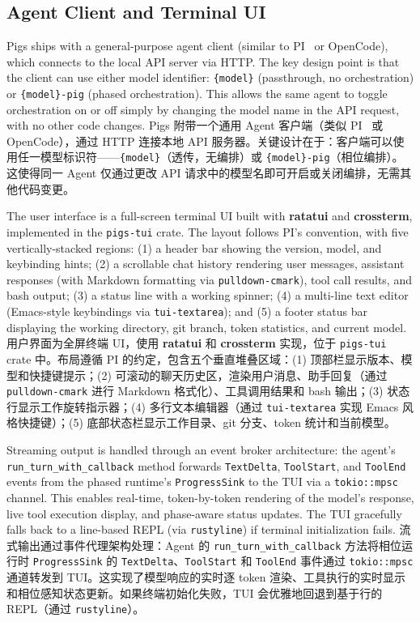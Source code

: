 \subsection{Agent Client and Terminal UI}

Pigs ships with a general-purpose agent client (similar to PI~\citep{omo2026} or OpenCode), which connects to the local API server via HTTP. The key design point is that the client can use either model identifier: \texttt{\{model\}} (passthrough, no orchestration) or \texttt{\{model\}-pig} (phased orchestration). This allows the same agent to toggle orchestration on or off simply by changing the model name in the API request, with no other code changes.
Pigs 附带一个通用 Agent 客户端（类似 PI~\citep{omo2026} 或 OpenCode），通过 HTTP 连接本地 API 服务器。关键设计在于：客户端可以使用任一模型标识符——\texttt{\{model\}}（透传，无编排）或 \texttt{\{model\}-pig}（相位编排）。这使得同一 Agent 仅通过更改 API 请求中的模型名即可开启或关闭编排，无需其他代码变更。

The user interface is a full-screen terminal UI built with \textbf{ratatui} and \textbf{crossterm}, implemented in the \texttt{pigs-tui} crate. The layout follows PI's convention, with five vertically-stacked regions: (1) a header bar showing the version, model, and keybinding hints; (2) a scrollable chat history rendering user messages, assistant responses (with Markdown formatting via \texttt{pulldown-cmark}), tool call results, and bash output; (3) a status line with a working spinner; (4) a multi-line text editor (Emacs-style keybindings via \texttt{tui-textarea}); and (5) a footer status bar displaying the working directory, git branch, token statistics, and current model.
用户界面为全屏终端 UI，使用 \textbf{ratatui} 和 \textbf{crossterm} 实现，位于 \texttt{pigs-tui} crate 中。布局遵循 PI 的约定，包含五个垂直堆叠区域：(1) 顶部栏显示版本、模型和快捷键提示；(2) 可滚动的聊天历史区，渲染用户消息、助手回复（通过 \texttt{pulldown-cmark} 进行 Markdown 格式化）、工具调用结果和 bash 输出；(3) 状态行显示工作旋转指示器；(4) 多行文本编辑器（通过 \texttt{tui-textarea} 实现 Emacs 风格快捷键）；(5) 底部状态栏显示工作目录、git 分支、token 统计和当前模型。

Streaming output is handled through an event broker architecture: the agent's \texttt{run\_turn\_with\_callback} method forwards \texttt{TextDelta}, \texttt{ToolStart}, and \texttt{ToolEnd} events from the phased runtime's \texttt{ProgressSink} to the TUI via a \texttt{tokio::mpsc} channel. This enables real-time, token-by-token rendering of the model's response, live tool execution display, and phase-aware status updates. The TUI gracefully falls back to a line-based REPL (via \texttt{rustyline}) if terminal initialization fails.
流式输出通过事件代理架构处理：Agent 的 \texttt{run\_turn\_with\_callback} 方法将相位运行时 \texttt{ProgressSink} 的 \texttt{TextDelta}、\texttt{ToolStart} 和 \texttt{ToolEnd} 事件通过 \texttt{tokio::mpsc} 通道转发到 TUI。这实现了模型响应的实时逐 token 渲染、工具执行的实时显示和相位感知状态更新。如果终端初始化失败，TUI 会优雅地回退到基于行的 REPL（通过 \texttt{rustyline}）。

